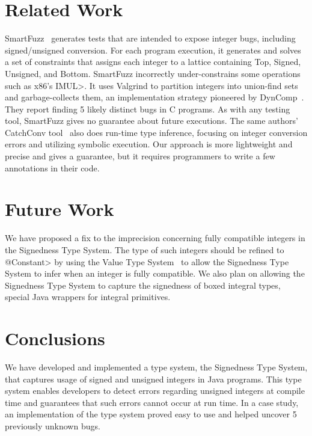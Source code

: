 \newpage
\section{Related Work} \label{related}

SmartFuzz~\cite{MolnarLW2009} generates tests that are intended to expose
integer bugs, including signed/unsigned conversion.  For each program
execution, it generates and solves a set of constraints that assigns each
integer to a lattice containing Top, Signed, Unsigned, and Bottom.
SmartFuzz incorrectly under-constrains some operations such as x86's
\<IMUL>.  It uses Valgrind to partition integers into union-find sets and
garbage-collects them, an implementation strategy pioneered by
DynComp~\cite{GuoPME2006}.  They report finding 5 likely distinct bugs in C
programs.  As with any testing tool, SmartFuzz gives no guarantee about
future executions.  The same authors' CatchConv tool~\cite{MolnarW2007}
also does run-time type inference, focusing on integer conversion errors
and utilizing symbolic execution.  Our approach is more lightweight and
precise and gives a guarantee, but it requires programmers to write a few
annotations in their code.

\section{Future Work} \label{future}
We have proposed a fix to the imprecision concerning fully
compatible integers in the Signedness Type System.
The type of such integers should be refined to \<@Constant> by using the
Value Type System~\cite{ValueChecker} to allow the Signedness Type System
to infer when an integer
is fully compatible. We also plan on allowing the Signedness Type System to
capture the signedness of boxed integral types, special Java wrappers for
integral primitives.


\section{Conclusions} \label{conc}

We have developed and implemented a type system, the Signedness Type System, that
captures usage of signed and unsigned
integers in Java programs.
This type system enables developers to detect errors regarding unsigned
integers at compile time and guarantees that such errors cannot occur at
run time. In a case study, an implementation of the type system proved easy to
use and helped uncover 5 previously unknown bugs.